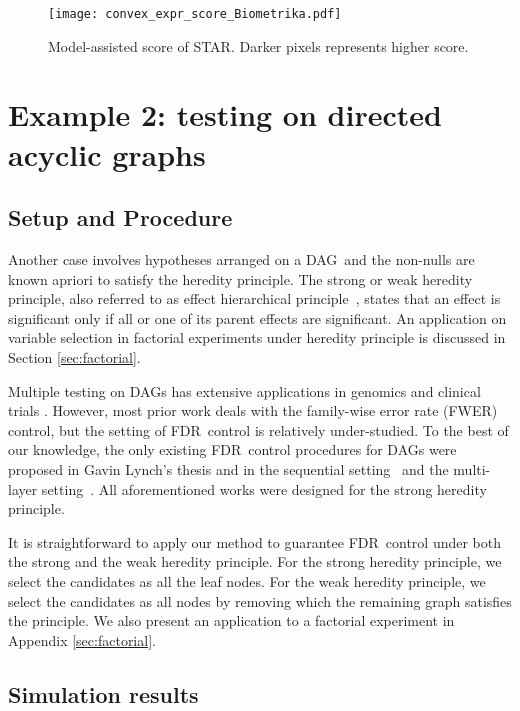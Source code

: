 \documentclass{biometrika}
\newcommand{\textFDR}{FDR}
\newcommand{\textFWER}{FWER}
\renewcommand{\star}{STAR}
\newcommand{\DAG}{DAG}
\newcommand{\1}{\mathbf{1}}
\begin{document}
\begin{figure}[t]
  \centering
  \texttt{[image: convex\_expr\_score\_Biometrika.pdf]}
  \caption{Model-assisted score of \star. Darker pixels represents higher score.}\label{fig:convex_expr_score}
\end{figure}

\section{Example 2: testing on directed acyclic graphs}\label{sec:DAG}
\subsection{Setup and Procedure}\label{subsubsec:DAG_proc}
Another case involves hypotheses arranged on a \DAG ~and the non-nulls are known apriori to satisfy the heredity principle. The strong or weak heredity principle, also referred to as effect hierarchical principle~\citep{wu00}, states that an effect is significant only if all or one of its parent effects are significant. An application on variable selection in factorial experiments under heredity principle is discussed in Section \ref{sec:factorial}.

Multiple testing on \DAG s has extensive applications in genomics \citep[e.g.,][]{goeman08, saunders14, meijer15} and clinical trials \citep[e.g.,][]{dmitrienko13}. However, most prior work deals with the family-wise error rate (\textFWER) control, but the setting of \textFDR ~control is relatively under-studied. To the best of our knowledge, the only existing \textFDR ~control procedures for \DAG s were proposed in Gavin Lynch's thesis \citep{lynch14} and in the sequential setting~\citep{ramdas2017dagger} and the multi-layer setting~\citep{ramdas2017unified}. All aforementioned works were designed for the strong heredity principle. 

It is straightforward to apply our method to guarantee \textFDR ~control under both the strong and the weak heredity principle. For the strong heredity principle, we select the candidates as all the leaf nodes. For the weak heredity principle, we select the candidates as all nodes by removing which the remaining graph satisfies the principle. We also present an application to a factorial experiment in Appendix \ref{sec:factorial}.

\subsection{Simulation results}
\end{document}
